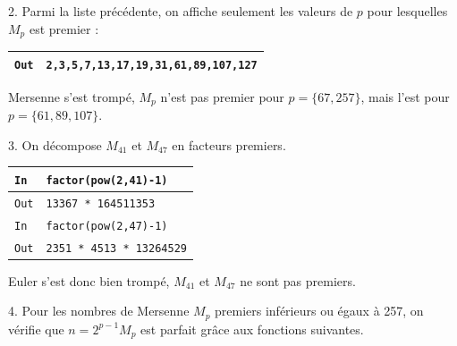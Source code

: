 \documentclass[titlepage]{article}
\begin{document}
    2. Parmi la liste précédente, on affiche seulement les valeurs de $p$ pour lesquelles $M_p$ est premier :

    

    \begin{tabularx}{12cm}{|p{0.60cm}|X|}
        \hline
        \texttt{Out}
        &
        \texttt{2,3,5,7,13,17,19,31,61,89,107,127}
        \\
        \hline
    \end{tabularx}
    \bigbreak

    Mersenne s'est trompé, $M_p$ n'est pas premier pour $p = \{67, 257\}$, mais l'est pour $p = \{61, 89, 107\}$.\bigbreak

    3. On décompose $M_{41}$ et $M_{47}$ en facteurs premiers.\bigbreak

    \begin{tabularx}{12cm}{|p{0.60cm}|X|}
        \hline
        \rowcolor{gray}
        \texttt{In}
        & 
        \texttt{factor(pow(2,41)-1)}
        \\
        \hline
        \texttt{Out}
        &
        \texttt{13367 * 164511353}
        \\
        \hline
        \rowcolor{gray}
        \texttt{In}
        & 
        \texttt{factor(pow(2,47)-1)}
        \\
        \hline
        \texttt{Out}
        &
        \texttt{2351 * 4513 * 13264529}
        \\
        \hline
    \end{tabularx}
    \bigbreak

    Euler s'est donc bien trompé, $M_{41}$ et $M_{47}$ ne sont pas premiers.\bigbreak

    4. Pour les nombres de Mersenne $M_p$ premiers inférieurs ou égaux à 257, on vérifie que $n = 2^{p-1}M_p$ est parfait grâce aux fonctions suivantes.
    
\end{document}
